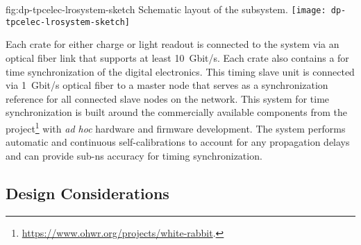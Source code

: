 \begin{dunefigure}{fig:dp-tpcelec-lrosystem-sketch}
{Schematic layout of the   subsystem.}
\texttt{[image: dp-tpcelec-lrosystem-sketch]}
\end{dunefigure}

Each  crate for either charge or light readout is connected to the  system via an optical fiber link that supports at least \SI{10}{Gbit/s}. Each crate also contains a  for time synchronization of the digital electronics. This timing slave unit is connected via \SI{1}{Gbit/s} optical fiber to a master node that serves as a synchronization reference for all connected slave nodes on the network. This system for time synchronization is built around the commercially available components from the  project\footnote{\url{https://www.ohwr.org/projects/white-rabbit}.} with \textit{ad hoc} hardware and firmware development. The system performs automatic and continuous self-calibrations to account for any propagation delays and can provide sub-\si{\nano\s} accuracy for timing synchronization.



\subsection{Design Considerations}
\label{ssec:dp-tpcelec-requir}

